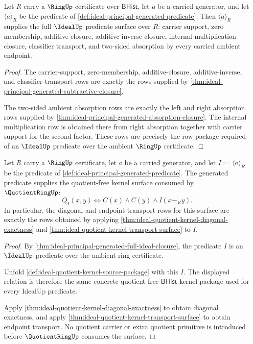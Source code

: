 \begin{theorem}
\label{thm:ideal-principal-generated-full-ideal-closure}
Let $R$ carry a $\RingUp$ certificate over $\mathsf{BHist}$, let $a$ be a carried generator, and let $\langle a\rangle_R$ be the predicate of \autoref{def:ideal-principal-generated-predicate}. Then $\langle a\rangle_R$ supplies the full $\IdealUp$ predicate surface over $R$: carrier support, zero membership, additive closure, additive inverse closure, internal multiplication closure, classifier transport, and two-sided absorption by every carried ambient endpoint.
\end{theorem}
\begin{proof}
The carrier-support, zero-membership, additive-closure, additive-inverse, and classifier-transport rows are exactly the rows supplied by \autoref{thm:ideal-principal-generated-subtractive-closure}.

The two-sided ambient absorption rows are exactly the left and right absorption rows supplied by \autoref{thm:ideal-principal-generated-absorption-closure}. The internal multiplication row is obtained there from right absorption together with carrier support for the second factor. These rows are precisely the row package required of an $\IdealUp$ predicate over the ambient $\RingUp$ certificate.
\end{proof}

\begin{theorem}
\label{thm:ideal-principal-generated-quotient-kernel-scope}
Let $R$ carry a $\RingUp$ certificate, let $a$ be a carried generator, and let $I:=\langle a\rangle_R$ be the predicate of \autoref{def:ideal-principal-generated-predicate}. The generated predicate supplies the quotient-free kernel surface consumed by $\QuotientRingUp$:
$$
Q_I(x,y)\Longleftrightarrow C(x)\land C(y)\land I(x-_R y).
$$
In particular, the diagonal and endpoint-transport rows for this surface are exactly the rows obtained by applying \autoref{thm:ideal-quotient-kernel-diagonal-exactness} and \autoref{thm:ideal-quotient-kernel-transport-surface} to $I$.
\end{theorem}
\begin{proof}
By \autoref{thm:ideal-principal-generated-full-ideal-closure}, the predicate $I$ is an $\IdealUp$ predicate over the ambient ring certificate.

Unfold \autoref{def:ideal-quotient-kernel-source-package} with this $I$. The displayed relation is therefore the same concrete quotient-free $\mathsf{BHist}$ kernel package used for every IdealUp predicate.

Apply \autoref{thm:ideal-quotient-kernel-diagonal-exactness} to obtain diagonal exactness, and apply \autoref{thm:ideal-quotient-kernel-transport-surface} to obtain endpoint transport. No quotient carrier or extra quotient primitive is introduced before $\QuotientRingUp$ consumes the surface.
\end{proof}

